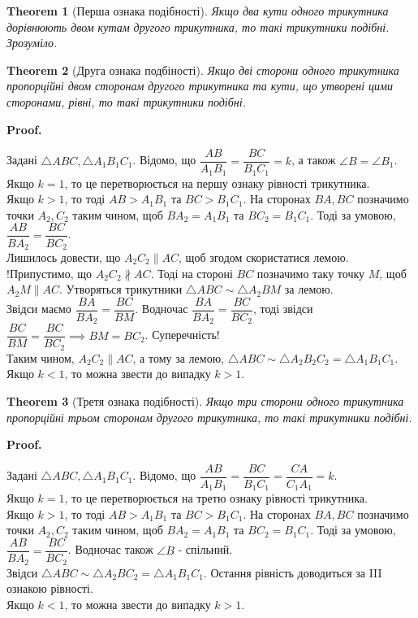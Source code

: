 \documentclass[a4paper, 10pt]{article}
\makeatletter
\def\qed{$\blacksquare$}
\theoremstyle{theoremdd}
\newtheorem{theorem}{Theorem}[subsection]
\theoremstyle{theoremdd}
\theoremstyle{theoremdd}
\theoremstyle{theoremdd}
\theoremstyle{theoremdd}
\theoremstyle{theoremdd}
\theoremstyle{theoremdd}
\theoremstyle{theoremdd}
\theoremstyle{theoremdd}
\renewenvironment{proof}[1][Proof.\\]{\par
\pushQED{\hfill \qed}%
\normalfont \topsep6\p@\@plus6\p@\relax
\trivlist
\item\relax
{\bfseries
#1\@addpunct{.}}\hspace\labelsep\ignorespaces
}{%
\popQED\endtrivlist\@endpefalse
}
\makeatother
\begin{document}
\begin{theorem}[Перша ознака подібності]
Якщо два кути одного трикутника дорівнюють двом кутам другого трикутника, то такі трикутники подібні.\\
\textit{Зрозуміло.}
\end{theorem}

\begin{theorem}[Друга ознака подбіності]
Якщо дві сторони одного трикутника пропорційні двом сторонам другого трикутника та кути, що утворені цими сторонами, рівні, то такі трикутники подібні.
\end{theorem}

\begin{proof}
Задані $\triangle ABC, \triangle A_1B_1C_1$. Відомо, що $\dfrac{AB}{A_1B_1} = \dfrac{BC}{B_1C_1} = k$, а також $\angle B = \angle B_1$.\\
Якщо $k = 1$, то це перетворюється на першу ознаку рівності трикутника.\\
Якщо $k > 1$, то тоді $AB > A_1B_1$ та $BC > B_1C_1$. На сторонах $BA,BC$ позначимо точки $A_2,C_2$ таким чином, щоб $BA_2 = A_1B_1$ та $BC_2 = B_1C_1$. Тоді за умовою, $\dfrac{AB}{BA_2} = \dfrac{BC}{BC_2}$.\\
Лишилось довести, що $A_2C_2 \parallel AC$, щоб згодом скористатися лемою.\\
!Припустимо, що $A_2C_2 \not\parallel AC$. Тоді на стороні $BC$ позначимо таку точку $M$, щоб $A_2M \parallel AC$. Утворяться трикутники $\triangle ABC \sim \triangle A_2BM$ за лемою.\\
Звідси маємо $\dfrac{BA}{BA_2} = \dfrac{BC}{BM}$. Водночас $\dfrac{BA}{BA_2} = \dfrac{BC}{BC_2}$, тоді звідси $\dfrac{BC}{BM} = \dfrac{BC}{BC_2} \implies BM = BC_2$. Суперечність!\\
Таким чином,  $A_2C_2 \parallel AC$, а тому за лемою, $\triangle ABC \sim \triangle A_2B_2C_2 = \triangle A_1B_1C_1$.\\
Якщо $k < 1$, то можна звести до випадку $k > 1$.
\end{proof}

\begin{theorem}[Третя ознака подібності]
Якщо три сторони одного трикутника пропорційні трьом сторонам другого трикутника, то такі трикутники подібні.
\end{theorem}

\begin{proof}
Задані $\triangle ABC, \triangle A_1B_1C_1$. Відомо, що $\dfrac{AB}{A_1B_1} = \dfrac{BC}{B_1C_1} = \dfrac{CA}{C_1A_1} = k$.\\
Якщо $k=1$, то це перетворюється на третю ознаку рівності трикутника.\\
Якщо $k > 1$, то тоді $AB > A_1B_1$ та $BC > B_1C_1$. На сторонах $BA,BC$ позначимо точки $A_2,C_2$ таким чином, щоб $BA_2 = A_1B_1$ та $BC_2 = B_1C_1$. Тоді за умовою, $\dfrac{AB}{BA_2} = \dfrac{BC}{BC_2}$. Водночас також $\angle B$ - спільний.\\
Звідси $\triangle ABC \sim \triangle A_2BC_2 = \triangle A_1B_1C_1$. Остання рівність доводиться за III ознакою рівності.\\
Якщо $k < 1$, то можна звести до випадку $k >1$.
\end{proof}
\end{document}
